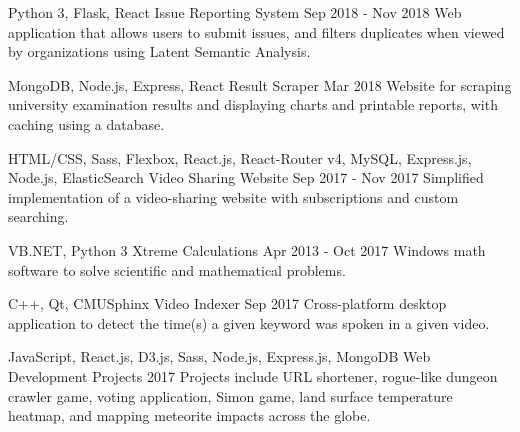 \begin{cventries}
  \cventry
    {Python 3, Flask, React} %
    {Issue Reporting System} %
    {} %
    {Sep 2018 - Nov 2018} %
    {
      Web application that allows users to submit issues, and filters duplicates when viewed by organizations using Latent Semantic Analysis.
    }

  \cventry
    {MongoDB, Node.js, Express, React} %
    {Result Scraper} %
    {} %
    {Mar 2018} %
    {
      Website for scraping university examination results and displaying charts and printable reports, with caching using a database.
    }

  \cventry
    {HTML/CSS, Sass, Flexbox, React.js, React-Router v4, MySQL, Express.js, Node.js, ElasticSearch} %
    {Video Sharing Website} %
    {} %
    {Sep 2017 - Nov 2017} %
    {
      Simplified implementation of a video-sharing website with subscriptions and custom searching.
    }

  \cventry
    {VB.NET, Python 3} %
    {Xtreme Calculations} %
    {} %
    {Apr 2013 - Oct 2017} %
    {
      Windows math software to solve scientific and mathematical problems.
    }

  \cventry
    {C++, Qt, CMUSphinx} %
    {Video Indexer} %
    {} %
    {Sep 2017} %
    {
      Cross-platform desktop application to detect the time(s) a given keyword was spoken in a given video.
    }

  \cventry
    {JavaScript, React.js, D3.js, Sass, Node.js, Express.js, MongoDB} %
    {Web Development Projects} %
    {} %
    {2017} %
    {
      Projects include URL shortener, rogue-like dungeon crawler game, voting application, Simon game, land surface temperature heatmap, and mapping meteorite impacts across the globe.
    }


\end{cventries}

